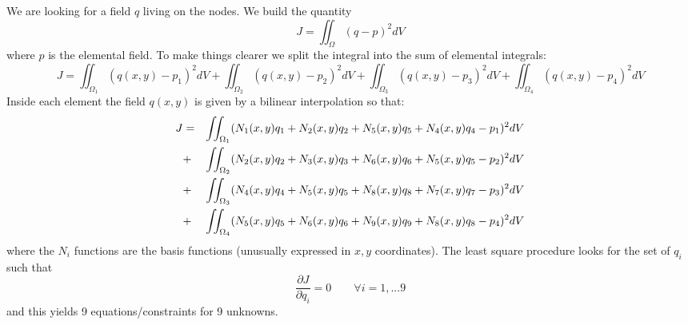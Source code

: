 We are looking for a field $q$ living on the nodes.
We build the quantity
\[
J=\iint_\Omega (q-p)^2 dV
\]
where $p$ is the elemental field. To make things clearer we split the integral into 
the sum of elemental integrals:
\[
J=
\iint_{\Omega_1} (q(x,y)-p_1)^2 dV+
\iint_{\Omega_2} (q(x,y)-p_2)^2 dV+
\iint_{\Omega_3} (q(x,y)-p_3)^2 dV+
\iint_{\Omega_4} (q(x,y)-p_4)^2 dV
\]
Inside each element the field $q(x,y)$ is given by a bilinear interpolation so that:
\begin{eqnarray}
J
&=& \iint_{\Omega_1} (N_1(x,y) q_1 + N_2(x,y)q_2 + N_5(x,y)q_5 + N_4(x,y)q_4 -p_1)^2 dV \nonumber\\
&+& \iint_{\Omega_2} (N_2(x,y) q_2 + N_3(x,y)q_3 + N_6(x,y)q_6 + N_5(x,y)q_5 -p_2)^2 dV \nonumber\\
&+& \iint_{\Omega_3} (N_4(x,y) q_4 + N_5(x,y)q_5 + N_8(x,y)q_8 + N_7(x,y)q_7 -p_3)^2 dV \nonumber\\
&+& \iint_{\Omega_4} (N_5(x,y) q_5 + N_6(x,y)q_6 + N_9(x,y)q_9 + N_8(x,y)q_8 -p_4)^2 dV 
\end{eqnarray}
where the $N_i$ functions are the basis functions (unusually expressed in $x,y$ coordinates).
The least square procedure looks for the set of $q_i$ such that 
\[
\frac{\partial J}{\partial q_i} =0 \qquad \forall i=1,...9
\]
and this yields 9 equations/constraints for 9 unknowns.
